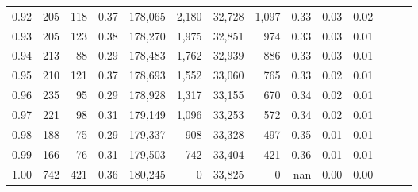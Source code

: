 \begin{tabular}{rrrrrrrrrrrrrr}
0.92 &    205 &  118 &  0.37 &  178,065 &    2,180 &  32,728 &   1,097 &  0.33 &  0.03 &      0.02 \\
0.93 &    205 &  123 &  0.38 &  178,270 &    1,975 &  32,851 &     974 &  0.33 &  0.03 &      0.01 \\
0.94 &    213 &   88 &  0.29 &  178,483 &    1,762 &  32,939 &     886 &  0.33 &  0.03 &      0.01 \\
0.95 &    210 &  121 &  0.37 &  178,693 &    1,552 &  33,060 &     765 &  0.33 &  0.02 &      0.01 \\
0.96 &    235 &   95 &  0.29 &  178,928 &    1,317 &  33,155 &     670 &  0.34 &  0.02 &      0.01 \\
0.97 &    221 &   98 &  0.31 &  179,149 &    1,096 &  33,253 &     572 &  0.34 &  0.02 &      0.01 \\
0.98 &    188 &   75 &  0.29 &  179,337 &      908 &  33,328 &     497 &  0.35 &  0.01 &      0.01 \\
0.99 &    166 &   76 &  0.31 &  179,503 &      742 &  33,404 &     421 &  0.36 &  0.01 &      0.01 \\
1.00 &    742 &  421 &  0.36 &  180,245 &        0 &  33,825 &       0 &   nan &  0.00 &      0.00 \\
\bottomrule
\end{tabular}

